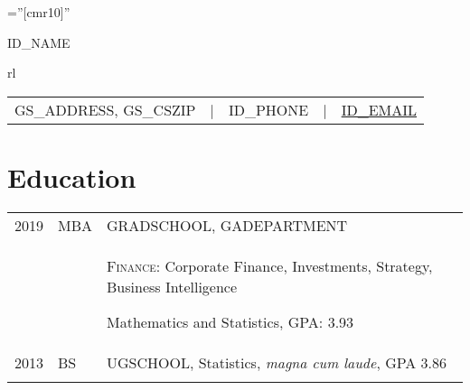 \documentclass[a4paper,10pt]{article}
\begin{document}

\sloppy







\font\fb=''[cmr10]'' %

\par{\centering
		{\Huge  \textsc{ID_NAME}}
		\smallskip \par
		\begin{tabular}{rl}
		\small
		\begin{tabular}{rllll}
			GS_ADDRESS, GS_CSZIP 	&
			| & ID_PHONE			&
    		| & \href{mailto:ID_EMAIL}{ID_EMAIL}	\\
		\end{tabular}
		\end{tabular}
		\bigskip
		\par}






\smallskip
\section{Education}
\begin{supertabular}{p{2cm} p{1.0cm} p{13.9cm}}
	\textsc{2019}		&		\textsc{MBA} & \textsc{GRADSCHOOL}, \small GADEPARTMENT \\
					&&		 \begin{enumerate*}[label =$\diamond$, itemjoin={\newline}]
							 \item \footnotesize  \textsc{Finance:} Corporate Finance, Investments, Strategy, Business Intelligence
							 \item \footnotesize Mathematics and Statistics, GPA: 3.93
							 \end{enumerate*}  \\
	\textsc{2013} 	& 	\textsc{BS} & \textsc{UGSCHOOL}, \small Statistics, \emph{magna cum laude}, GPA 3.86 \\
	 \\
\end{supertabular}
\end{document}

